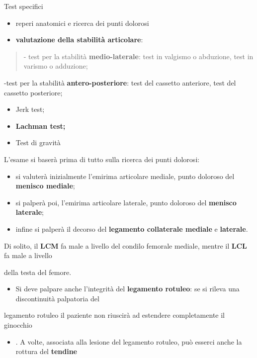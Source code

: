 \documentclass[]{article}
\begin{document}
Test specifici

\begin{itemize}
\item
  reperi anatomici e ricerca dei punti dolorosi
\item
  \textbf{valutazione della stabilità articolare}:
\end{itemize}

\begin{quote}
- test per la stabilità \textbf{medio-laterale}: test in valgismo o
abduzione, test in varismo o adduzione;
\end{quote}

-test per la stabilità \textbf{antero-posteriore}: test del cassetto
anteriore, test del cassetto posteriore;

\begin{itemize}
\item
  Jerk test;
\item
  \textbf{Lachman test;}
\item
  Test di gravità
\end{itemize}

L'esame si baserà prima di tutto sulla ricerca dei punti dolorosi:

\begin{itemize}
\item
  si valuterà inizialmente l'emirima articolare mediale, punto doloroso
  del \textbf{menisco mediale};
\item
  si palperà poi, l'emirima articolare laterale, punto doloroso del
  \textbf{menisco laterale};
\item
  infine si palperà il decorso del \textbf{legamento collaterale
  mediale} e \textbf{laterale}.
\end{itemize}

Di solito, il \textbf{LCM} fa male a livello del condilo femorale
mediale, mentre il \textbf{LCL} fa male a livello

della testa del femore.

\begin{itemize}
\item
  Si deve palpare anche l'integrità del \textbf{legamento rotuleo}: se
  si rileva una discontinuità palpatoria del
\end{itemize}

legamento rotuleo il paziente non riuscirà ad estendere completamente il
ginocchio

\begin{itemize}
\item
  . A volte, associata alla lesione del legamento rotuleo, può esserci
  anche la rottura del \textbf{tendine}
\end{itemize}
\end{document}
